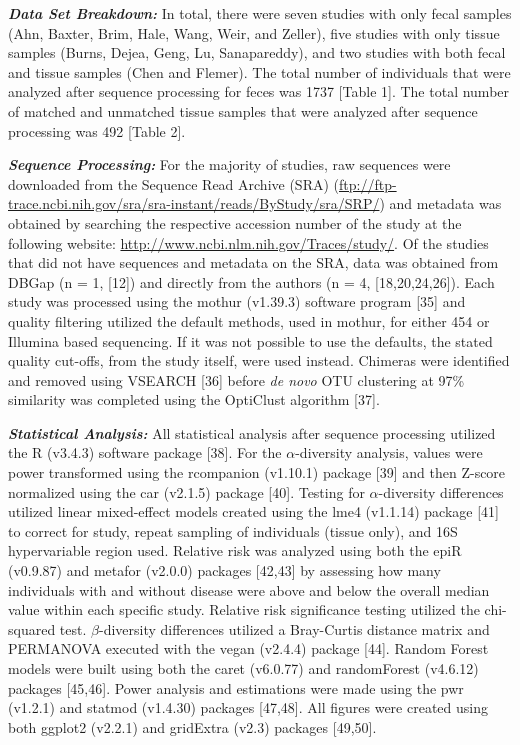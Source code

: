 \documentclass[12pt,]{article}
\begin{document}
\textbf{\emph{Data Set Breakdown:}} In total, there were seven studies
with only fecal samples (Ahn, Baxter, Brim, Hale, Wang, Weir, and
Zeller), five studies with only tissue samples (Burns, Dejea, Geng, Lu,
Sanapareddy), and two studies with both fecal and tissue samples (Chen
and Flemer). The total number of individuals that were analyzed after
sequence processing for feces was 1737 {[}Table 1{]}. The total number
of matched and unmatched tissue samples that were analyzed after
sequence processing was 492 {[}Table 2{]}.

\textbf{\emph{Sequence Processing:}} For the majority of studies, raw
sequences were downloaded from the Sequence Read Archive (SRA)
(\url{ftp://ftp-trace.ncbi.nih.gov/sra/sra-instant/reads/ByStudy/sra/SRP/})
and metadata was obtained by searching the respective accession number
of the study at the following website:
\url{http://www.ncbi.nlm.nih.gov/Traces/study/}. Of the studies that did
not have sequences and metadata on the SRA, data was obtained from DBGap
(n = 1, {[}12{]}) and directly from the authors (n = 4,
{[}18,20,24,26{]}). Each study was processed using the mothur (v1.39.3)
software program {[}35{]} and quality filtering utilized the default
methods, used in mothur, for either 454 or Illumina based sequencing. If
it was not possible to use the defaults, the stated quality cut-offs,
from the study itself, were used instead. Chimeras were identified and
removed using VSEARCH {[}36{]} before \emph{de novo} OTU clustering at
97\% similarity was completed using the OptiClust algorithm {[}37{]}.

\textbf{\emph{Statistical Analysis:}} All statistical analysis after
sequence processing utilized the R (v3.4.3) software package {[}38{]}.
For the \(\alpha\)-diversity analysis, values were power transformed
using the rcompanion (v1.10.1) package {[}39{]} and then Z-score
normalized using the car (v2.1.5) package {[}40{]}. Testing for
\(\alpha\)-diversity differences utilized linear mixed-effect models
created using the lme4 (v1.1.14) package {[}41{]} to correct for study,
repeat sampling of individuals (tissue only), and 16S hypervariable
region used. Relative risk was analyzed using both the epiR (v0.9.87)
and metafor (v2.0.0) packages {[}42,43{]} by assessing how many
individuals with and without disease were above and below the overall
median value within each specific study. Relative risk significance
testing utilized the chi-squared test. \(\beta\)-diversity differences
utilized a Bray-Curtis distance matrix and PERMANOVA executed with the
vegan (v2.4.4) package {[}44{]}. Random Forest models were built using
both the caret (v6.0.77) and randomForest (v4.6.12) packages
{[}45,46{]}. Power analysis and estimations were made using the pwr
(v1.2.1) and statmod (v1.4.30) packages {[}47,48{]}. All figures were
created using both ggplot2 (v2.2.1) and gridExtra (v2.3) packages
{[}49,50{]}.
\end{document}
